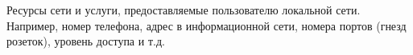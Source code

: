 Ресурсы сети и услуги, предоставляемые пользователю 
локальной сети. Например, номер телефона, адрес в информационной
сети, номера портов (гнезд розеток), уровень доступа и т.д.